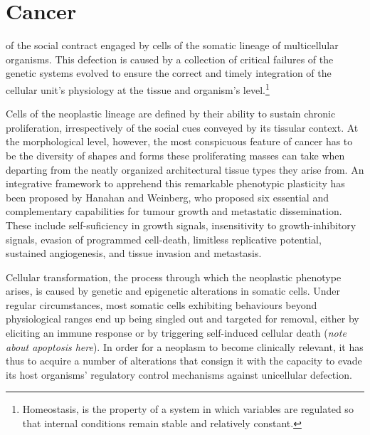 \documentclass{tufte-book}
\begin{document}
\section{Cancer}


 of the social contract engaged by cells of the
somatic lineage of multicellular organisms.  This defection is caused by a
collection of critical failures of the genetic systems evolved to ensure the
correct and timely integration of the cellular unit's physiology at the tissue
and organism's level.\footnote{Homeostasis, is the property of a system in which
  variables are regulated so that internal conditions remain stable and
  relatively constant.}

\bigskip

Cells of the neoplastic lineage are defined by their ability to sustain chronic
proliferation, irrespectively of the social cues conveyed by its tissular
context.  At the morphological level, however, the most conspicuous feature of
cancer has to be the diversity of shapes and forms these proliferating masses
can take when departing from the neatly organized architectural tissue types
they arise from.  An integrative framework to apprehend this remarkable
phenotypic plasticity has been proposed by Hanahan and
Weinberg,\cite{hanahan_hallmarks_2000,hanahan_hallmarks_2011} who proposed six
essential and complementary capabilities for tumour growth and metastatic
dissemination.  These include self-suficiency in growth signals, insensitivity
to growth-inhibitory signals, evasion of programmed cell-death, limitless
replicative potential, sustained angiogenesis, and tissue invasion and
metastasis.

Cellular transformation, the process through which the neoplastic phenotype
arises, is caused by genetic and epigenetic alterations in somatic cells.  Under
regular circumstances, most somatic cells exhibiting behaviours beyond
physiological ranges end up being singled out and targeted for removal, either
by eliciting an immune response or by triggering self-induced cellular death
(\emph{note about apoptosis here}).  In order for a neoplasm to become
clinically relevant, it has thus to acquire a number of alterations that consign
it with the capacity to evade its host organisms' regulatory control mechanisms
against unicellular defection.

\end{document}
